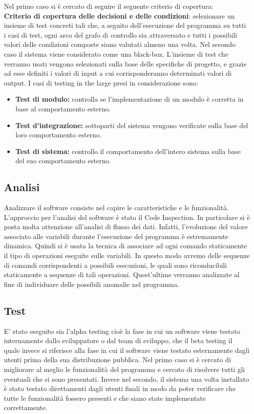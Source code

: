 \documentclass[a4paper,final,12pt]{report}
\begin{document}
Nel primo caso si è cercato di seguire il seguente criterio di copertura:\\
\textbf{Criterio di copertura delle decisioni e delle condizioni}: selezionare un insieme di test concreti tali che, a seguito dell’esecuzione del programma su tutti i casi di test, ogni arco del grafo di controllo sia attraversato e tutti i possibili valori delle condizioni composte siano valutati almeno una volta.
Nel secondo caso il sistema viene considerato come una black-box. L'insieme di test che verranno usati vengono selezionati sulla base delle specifiche di progetto, e grazie ad esse definiti i valori di input a cui corrisponderanno determinati valori di output. 
I casi di testing in the large presi in considerazione sono:
\begin{itemize}
\item \textbf{Test di modulo:} controlla se l'implementazione di un modulo è corretta in base al comportamento esterno.
\item \textbf{Test d'integrazione:} sottoparti del sistema vengono verificate sulla base del loro comportamento esterno.
\item \textbf{Test di sistema:} controllo il comportamento dell'intero sistema sulla  base del suo comportamento esterno. 
\end{itemize}

\subsection{Analisi}
Analizzare il software consiste nel capire le caratteristiche e le funzionalità.
L'approccio per l'analisi del software è stato il Code Inspection. In particolare si è posta molta attenzione all'analisi di flusso dei dati.
Infatti, l'evoluzione del valore associato alle variabili durante l'esecuzione del programma è estremamente dinamica. Quindi si è usata la tecnica di associare ad ogni comando staticamente il tipo di operazioni eseguite sulle variabili. In questo modo avremo delle sequenze di comandi corrispondenti a possibili esecuzioni, le quali sono riconducibili staticamente a sequenze di tali operazioni. Quest'ultime verranno analizzate al fine di individuare delle possibili anomalie nel programma.

\subsection{Test}
E' stato eseguito sia l'alpha testing cioè la fase in cui un software viene testato internamente dallo sviluppatore o dal team di sviluppo, che il beta testing il quale invece si riferisce alla fase in cui il software viene testato esternamente dagli utenti prima della sua distribuzione pubblica. Nel primo caso si è cercato di migliorare al meglio le funzionalità del programma e cercato di risolvere tutti gli eventuali che si sono presentati. Invece nel secondo, il sistema una volta installato è stato testato direttamenti dagli utenti finali in modo da poter verificare che tutte le funzionalità fossero presenti e che siano state implementate correttamente.
\end{document}

